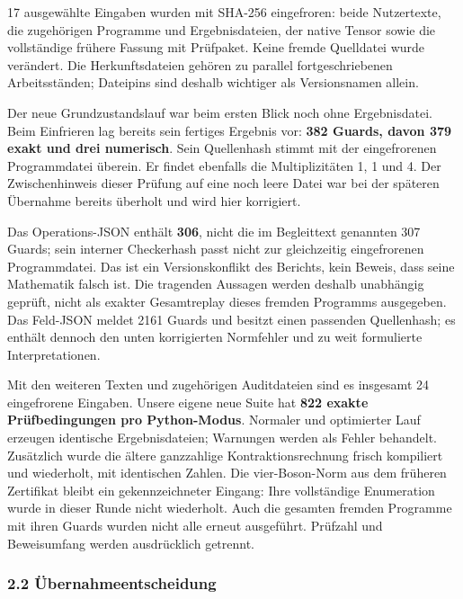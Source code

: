 17 ausgewählte Eingaben wurden mit SHA-256 eingefroren: beide
Nutzertexte, die zugehörigen Programme und Ergebnisdateien, der native
Tensor sowie die vollständige frühere Fassung mit Prüfpaket. Keine
fremde Quelldatei wurde verändert. Die Herkunftsdateien gehören zu
parallel fortgeschriebenen Arbeitsständen; Dateipins sind deshalb
wichtiger als Versionsnamen allein.

Der neue Grundzustandslauf war beim ersten Blick noch ohne
Ergebnisdatei. Beim Einfrieren lag bereits sein fertiges Ergebnis vor:
\textbf{382 Guards, davon 379 exakt und drei numerisch}. Sein
Quellenhash stimmt mit der eingefrorenen Programmdatei überein. Er
findet ebenfalls die Multiplizitäten 1, 1 und 4. Der Zwischenhinweis
dieser Prüfung auf eine noch leere Datei war bei der späteren Übernahme
bereits überholt und wird hier korrigiert.

Das Operations-JSON enthält \textbf{306}, nicht die im Begleittext
genannten 307 Guards; sein interner Checkerhash passt nicht zur
gleichzeitig eingefrorenen Programmdatei. Das ist ein Versionskonflikt
des Berichts, kein Beweis, dass seine Mathematik falsch ist. Die
tragenden Aussagen werden deshalb unabhängig geprüft, nicht als exakter
Gesamtreplay dieses fremden Programms ausgegeben. Das Feld-JSON meldet
2161 Guards und besitzt einen passenden Quellenhash; es enthält dennoch
den unten korrigierten Normfehler und zu weit formulierte
Interpretationen.

Mit den weiteren Texten und zugehörigen Auditdateien sind es insgesamt
24 eingefrorene Eingaben. Unsere eigene neue Suite hat \textbf{822
exakte Prüfbedingungen pro Python-Modus}. Normaler und optimierter Lauf
erzeugen identische Ergebnisdateien; Warnungen werden als Fehler
behandelt. Zusätzlich wurde die ältere ganzzahlige Kontraktionsrechnung
frisch kompiliert und wiederholt, mit identischen Zahlen. Die
vier-Boson-Norm aus dem früheren Zertifikat bleibt ein gekennzeichneter
Eingang: Ihre vollständige Enumeration wurde in dieser Runde nicht
wiederholt. Auch die gesamten fremden Programme mit ihren Guards wurden
nicht alle erneut ausgeführt. Prüfzahl und Beweisumfang werden
ausdrücklich getrennt.

\subsubsection{2.2
Übernahmeentscheidung}\label{uxfcbernahmeentscheidung}

